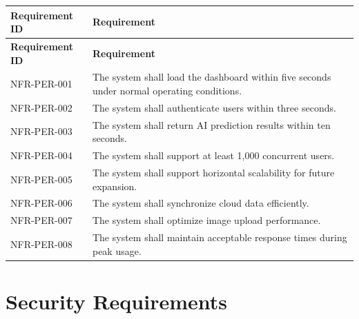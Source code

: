 \begin{longtable}{|p{3cm}|p{10cm}|}

\hline
\textbf{Requirement ID} &
\textbf{Requirement}\\
\hline
\endfirsthead

\hline
\textbf{Requirement ID} &
\textbf{Requirement}\\
\hline
\endhead

NFR-PER-001 &
The system shall load the dashboard within five seconds under normal operating conditions.\\
\hline

NFR-PER-002 &
The system shall authenticate users within three seconds.\\
\hline

NFR-PER-003 &
The system shall return AI prediction results within ten seconds.\\
\hline

NFR-PER-004 &
The system shall support at least 1,000 concurrent users.\\
\hline

NFR-PER-005 &
The system shall support horizontal scalability for future expansion.\\
\hline

NFR-PER-006 &
The system shall synchronize cloud data efficiently.\\
\hline

NFR-PER-007 &
The system shall optimize image upload performance.\\
\hline

NFR-PER-008 &
The system shall maintain acceptable response times during peak usage.\\
\hline

\end{longtable}

\section{Security Requirements}
\label{sec:security}

